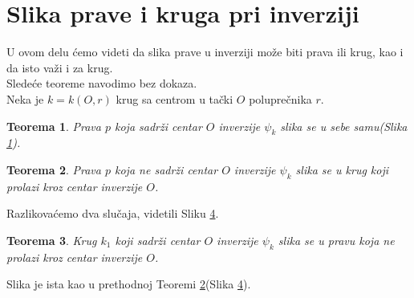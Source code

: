 \documentclass[a4paper,12pt]{article}
\newtheorem{teorema}{{Teorema}}[section]
\theoremstyle{definition}
\begin{document}
\newpage		
\section{Slika prave i kruga pri inverziji}

U ovom delu \'{c}emo videti da slika prave u inverziji mo\v{z}e biti prava ili krug, kao i da isto va\v{z}i i za krug.\\

Slede\'{c}e teoreme navodimo bez dokaza.\\

Neka je $k=k(O,r)$ krug sa centrom u ta\v{c}ki $O$ polupre\v{c}nika $r$.\\

\begin{teorema}
Prava $p$ koja sadr\v{z}i centar $O$ inverzije $\psi_k$ slika se u sebe samu(Slika \ref{slk:1}).
\end{teorema}

\begin{figure}[h!]
   \begin{center}
       
   \end{center}
    \caption{}
    \label{slk:1}
\end{figure}

\begin{teorema}
\label{th:krugprava}
Prava $p$ koja ne sadr\v{z}i centar $O$ inverzije $\psi_k$ slika se u krug koji prolazi kroz centar inverzije $O$.
\end{teorema}

Razlikova\'{c}emo dva slu\v{c}aja, videtili Sliku \ref{slk:krugprava}.

\begin{figure}[h!]
	\begin{subfigure}{80mm}
		
		\label{slk:sece}
	\end{subfigure}
	\begin{subfigure}{80mm}
		
		\label{slk:ne_sece}
	\end{subfigure}
\caption{}
\label{slk:krugprava}
\end{figure}

\begin{teorema}
Krug $k_1$ koji sadr\v{z}i centar $O$ inverzije $\psi_k$ slika se u pravu koja ne prolazi kroz centar inverzije $O$.
\end{teorema}
Slika je ista kao u prethodnoj Teoremi \ref{th:krugprava}(Slika \ref{slk:krugprava}).
\end{document}
